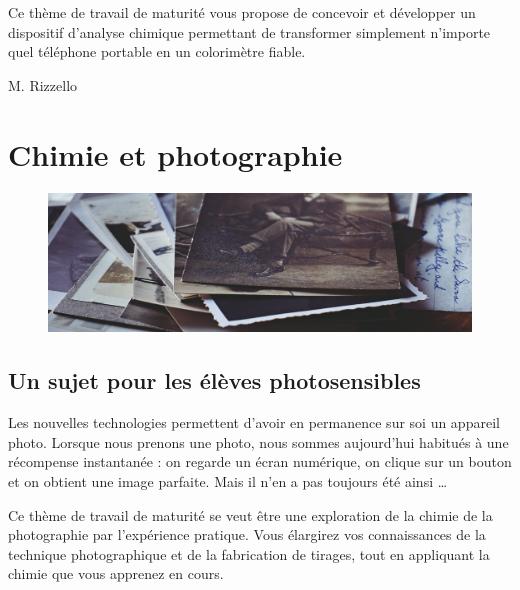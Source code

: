 \documentclass[
  10pt,
  french,
  a5paper,
  openany]{book}
\newenvironment{signature}{\begin{flushright}}{\end{flushright}}
\begin{document}
Ce thème de travail de maturité vous propose de concevoir et développer un dispositif d'analyse chimique permettant de transformer simplement n'importe quel téléphone portable en un colorimètre fiable.

\begin{signature}
M. Rizzello

\end{signature}

\hypertarget{chimie-et-photographie}{%
\chapter{Chimie et photographie}\label{chimie-et-photographie}}

\begin{figure}

{\centering \includegraphics[height=10em]{images/chimie-et-photographie} 

}

\end{figure}


\hypertarget{un-sujet-pour-les-uxe9luxe8ves-photosensibles}{%
\section*{Un sujet pour les élèves photosensibles}\label{un-sujet-pour-les-uxe9luxe8ves-photosensibles}}

Les nouvelles technologies permettent d'avoir en permanence sur soi un appareil photo. Lorsque nous prenons une photo, nous sommes aujourd'hui habitués à une récompense instantanée : on regarde un écran numérique, on clique sur un bouton et on obtient une image parfaite. Mais il n'en a pas toujours été ainsi \ldots{}

Ce thème de travail de maturité se veut être une exploration de la chimie de la photographie par l'expérience pratique. Vous élargirez vos connaissances de la technique photographique et de la fabrication de tirages, tout en appliquant la chimie que vous apprenez en cours.
\end{document}
